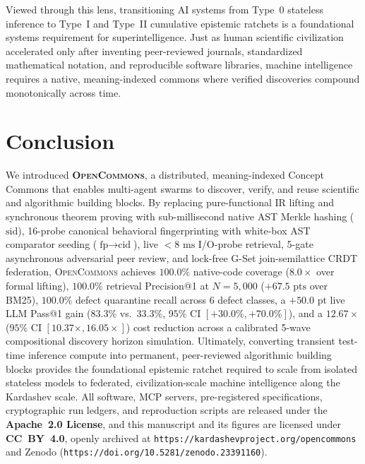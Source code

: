 \documentclass[10pt,twocolumn]{article}
\begin{document}
Viewed through this lens, transitioning AI systems from Type~0 stateless inference to Type~I and Type~II cumulative epistemic ratchets is a foundational systems requirement for superintelligence. Just as human scientific civilization accelerated only after inventing peer-reviewed journals, standardized mathematical notation, and reproducible software libraries, machine intelligence requires a native, meaning-indexed commons where verified discoveries compound monotonically across time.

\section{Conclusion}
\label{sec:conclusion}

We introduced \textbf{\textsc{OpenCommons}}, a distributed, meaning-indexed Concept Commons that enables multi-agent swarms to discover, verify, and reuse scientific and algorithmic building blocks. By replacing pure-functional IR lifting and synchronous theorem proving with sub-millisecond native AST Merkle hashing ($\text{sid}$), 16-probe canonical behavioral fingerprinting with white-box AST comparator seeding ($\text{fp} \to \text{cid}$), live $<8\text{ ms}$ I/O-probe retrieval, 5-gate asynchronous adversarial peer review, and lock-free G-Set join-semilattice CRDT federation, \textsc{OpenCommons} achieves $100.0\%$ native-code coverage ($8.0\times$ over formal lifting), $100.0\%$ retrieval Precision@1 at $N=5{,}000$ ($+67.5\text{ pts}$ over BM25), $100.0\%$ defect quarantine recall across 6 defect classes, a $+50.0\text{ pt}$ live LLM Pass@1 gain ($83.3\%$ vs.\ $33.3\%$, $95\%$ CI $[+30.0\%, +70.0\%]$), and a $12.67\times$ ($95\%$ CI $[10.37\times, 16.05\times]$) cost reduction across a calibrated 5-wave compositional discovery horizon simulation. Ultimately, converting transient test-time inference compute into permanent, peer-reviewed algorithmic building blocks provides the foundational epistemic ratchet required to scale from isolated stateless models to federated, civilization-scale machine intelligence along the Kardashev scale. All software, MCP servers, pre-registered specifications, cryptographic run ledgers, and reproduction scripts are released under the \textbf{Apache~2.0 License}, and this manuscript and its figures are licensed under \textbf{CC~BY~4.0}, openly archived at \texttt{https://kardashevproject.org/opencommons} and Zenodo (\texttt{https://doi.org/10.5281/zenodo.23391160}).
\end{document}
